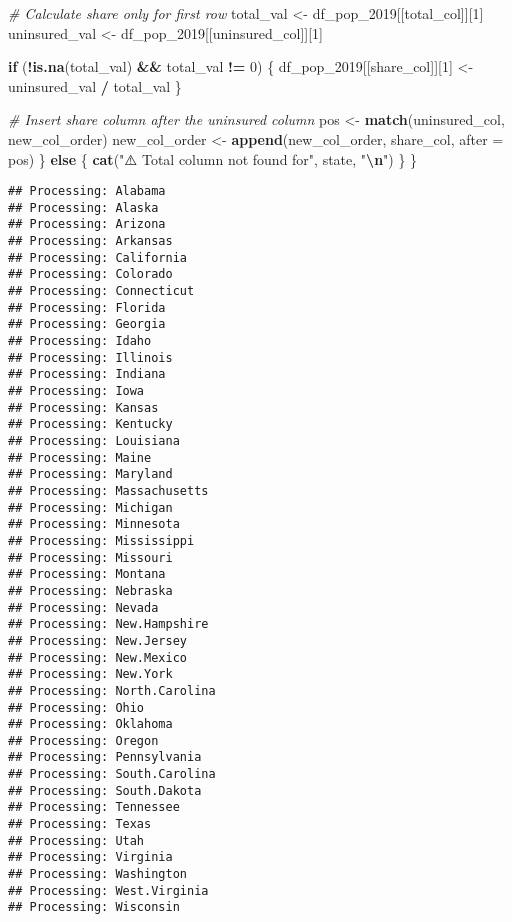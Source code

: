 \documentclass[
]{article}
\newenvironment{Shaded}{\begin{snugshade}}{\end{snugshade}}
\newcommand{\AttributeTok}[1]{\textcolor[rgb]{0.13,0.29,0.53}{#1}}
\newcommand{\CommentTok}[1]{\textcolor[rgb]{0.56,0.35,0.01}{\textit{#1}}}
\newcommand{\ControlFlowTok}[1]{\textcolor[rgb]{0.13,0.29,0.53}{\textbf{#1}}}
\newcommand{\DecValTok}[1]{\textcolor[rgb]{0.00,0.00,0.81}{#1}}
\newcommand{\FunctionTok}[1]{\textcolor[rgb]{0.13,0.29,0.53}{\textbf{#1}}}
\newcommand{\NormalTok}[1]{#1}
\newcommand{\OtherTok}[1]{\textcolor[rgb]{0.56,0.35,0.01}{#1}}
\newcommand{\SpecialCharTok}[1]{\textcolor[rgb]{0.81,0.36,0.00}{\textbf{#1}}}
\newcommand{\StringTok}[1]{\textcolor[rgb]{0.31,0.60,0.02}{#1}}
\begin{document}
\begin{Shaded}
\begin{Highlighting}[]
    \CommentTok{\# Calculate share only for first row}
\NormalTok{    total\_val }\OtherTok{\textless{}{-}}\NormalTok{ df\_pop\_2019[[total\_col]][}\DecValTok{1}\NormalTok{]}
\NormalTok{    uninsured\_val }\OtherTok{\textless{}{-}}\NormalTok{ df\_pop\_2019[[uninsured\_col]][}\DecValTok{1}\NormalTok{]}
    
    \ControlFlowTok{if}\NormalTok{ (}\SpecialCharTok{!}\FunctionTok{is.na}\NormalTok{(total\_val) }\SpecialCharTok{\&\&}\NormalTok{ total\_val }\SpecialCharTok{!=} \DecValTok{0}\NormalTok{) \{}
\NormalTok{      df\_pop\_2019[[share\_col]][}\DecValTok{1}\NormalTok{] }\OtherTok{\textless{}{-}}\NormalTok{ uninsured\_val }\SpecialCharTok{/}\NormalTok{ total\_val}
\NormalTok{    \}}
    
    \CommentTok{\# Insert share column after the uninsured column}
\NormalTok{    pos }\OtherTok{\textless{}{-}} \FunctionTok{match}\NormalTok{(uninsured\_col, new\_col\_order)}
\NormalTok{    new\_col\_order }\OtherTok{\textless{}{-}} \FunctionTok{append}\NormalTok{(new\_col\_order, share\_col, }\AttributeTok{after =}\NormalTok{ pos)}
\NormalTok{  \} }\ControlFlowTok{else}\NormalTok{ \{}
    \FunctionTok{cat}\NormalTok{(}\StringTok{"⚠️ Total column not found for"}\NormalTok{, state, }\StringTok{"}\SpecialCharTok{\textbackslash{}n}\StringTok{"}\NormalTok{)}
\NormalTok{  \}}
\NormalTok{\}}
\end{Highlighting}
\end{Shaded}

\begin{verbatim}
## Processing: Alabama 
## Processing: Alaska 
## Processing: Arizona 
## Processing: Arkansas 
## Processing: California 
## Processing: Colorado 
## Processing: Connecticut 
## Processing: Florida 
## Processing: Georgia 
## Processing: Idaho 
## Processing: Illinois 
## Processing: Indiana 
## Processing: Iowa 
## Processing: Kansas 
## Processing: Kentucky 
## Processing: Louisiana 
## Processing: Maine 
## Processing: Maryland 
## Processing: Massachusetts 
## Processing: Michigan 
## Processing: Minnesota 
## Processing: Mississippi 
## Processing: Missouri 
## Processing: Montana 
## Processing: Nebraska 
## Processing: Nevada 
## Processing: New.Hampshire 
## Processing: New.Jersey 
## Processing: New.Mexico 
## Processing: New.York 
## Processing: North.Carolina 
## Processing: Ohio 
## Processing: Oklahoma 
## Processing: Oregon 
## Processing: Pennsylvania 
## Processing: South.Carolina 
## Processing: South.Dakota 
## Processing: Tennessee 
## Processing: Texas 
## Processing: Utah 
## Processing: Virginia 
## Processing: Washington 
## Processing: West.Virginia 
## Processing: Wisconsin
\end{verbatim}
\end{document}
